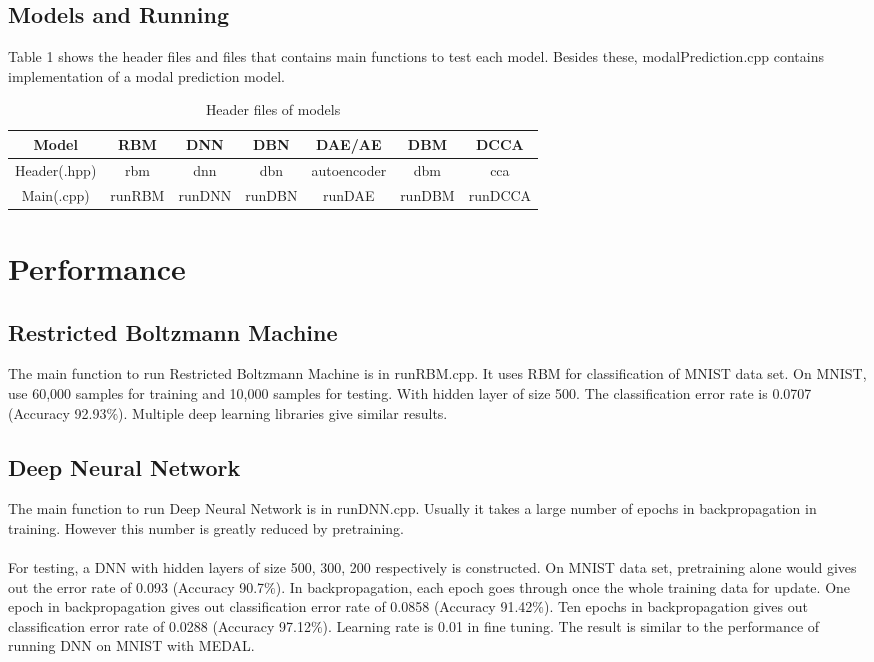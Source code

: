 \documentclass[12pt]{article}
\begin{document}
\subsection{Models and Running}
Table 1 shows the header files and files that contains main functions to test each model. Besides these, modalPrediction.cpp contains implementation of a modal prediction model.
\begin{table}[h]
\centering
\begin{tabular}{|c|c|c|c|c|c|c|}
\hline
Model & RBM & DNN & DBN & DAE/AE & DBM & DCCA\\
\hline
Header(.hpp) & rbm &dnn & dbn & autoencoder & dbm & cca\\
\hline
Main(.cpp) & runRBM & runDNN & runDBN & runDAE &runDBM & runDCCA \\
\hline
\end{tabular}
\caption{Header files of models}
\end{table}
\clearpage
\section{Performance}
\subsection{Restricted Boltzmann Machine}
The main function to run Restricted Boltzmann Machine is in runRBM.cpp. It uses RBM for classification of MNIST data set. On MNIST, use 60,000 samples for training and 10,000 samples for testing. With hidden layer of size 500. The classification error rate is 0.0707 (Accuracy 92.93$\%$). Multiple deep learning libraries give similar results.
\subsection{Deep Neural Network}
The main function to run Deep Neural Network is in runDNN.cpp. Usually it takes a large number of epochs in backpropagation in training. However this number is greatly reduced by pretraining.\\
\\
For testing, a DNN with hidden layers of size 500, 300, 200 respectively is constructed. On MNIST data set, pretraining alone would gives out the error rate of 0.093 (Accuracy 90.7$\%$). In backpropagation, each epoch goes through once the whole training data for update. One epoch in backpropagation gives out classification error rate of 0.0858 (Accuracy 91.42$\%$). Ten epochs in backpropagation gives out classification error rate of 0.0288 (Accuracy 97.12$\%$). Learning rate is 0.01 in fine tuning. The result is similar to the performance of running DNN on MNIST with MEDAL. 
\end{document}

